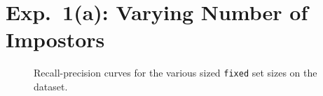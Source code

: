 \section{Exp.\ 1(a): Varying Number of Impostors}
\label{app:exp_student_dif_n}


\begin{figure}[H]
    \centering
    
    \caption[Recall-precision curves for the various sized \imp{} set sizes]{Recall-precision curves for the various sized \texttt{fixed} \imp{} set sizes on the \dataStudent{} dataset.}
    \label{fig:student_essays_dif_n}
\end{figure}